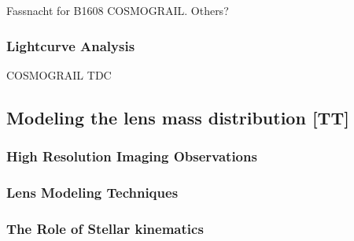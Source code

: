 


Fassnacht for B1608
COSMOGRAIL.
Others?



\subsubsection{Lightcurve Analysis}



COSMOGRAIL
TDC



\subsection{Modeling the lens mass distribution [TT]}
\label{sec:lensmodel}



\subsubsection{High Resolution Imaging Observations}





\subsubsection{Lens Modeling Techniques}




\subsubsection{The Role of Stellar kinematics}


